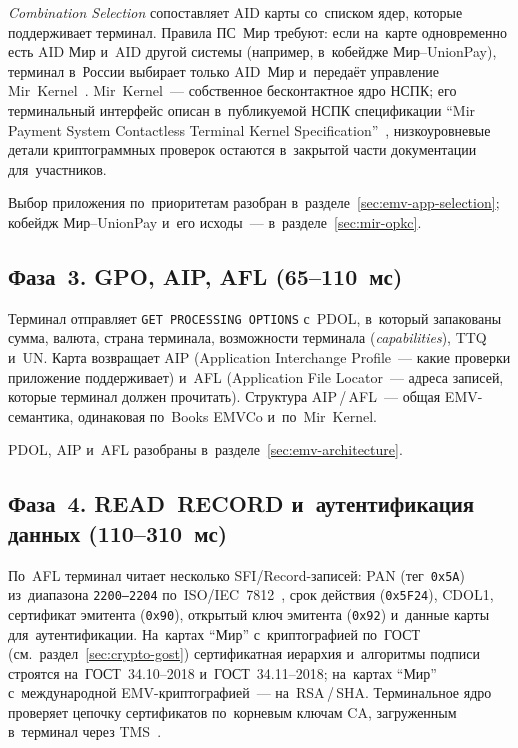\textit{Combination Selection} сопоставляет AID карты со~списком ядер, которые поддерживает
терминал. Правила ПС~Мир требуют: если на~карте
одновременно есть AID Мир и~AID другой системы (например, в~кобейдже
Мир--UnionPay), терминал в~России выбирает только AID~Мир и~передаёт
управление Mir~Kernel~\cite{nspk-mir-rules-v43,nexo-mir-fast-2022}.
Mir~Kernel~--- собственное бесконтактное ядро НСПК; его терминальный интерфейс
описан в~публикуемой НСПК спецификации \enquote{Mir Payment System Contactless
Terminal Kernel Specification}~\cite{nspk-mir-kernel}, низкоуровневые детали
криптограммных проверок остаются в~закрытой части документации для~участников.

Выбор приложения по~приоритетам разобран в~разделе~\ref{sec:emv-app-selection};
кобейдж Мир--UnionPay и~его исходы~--- в~разделе~\ref{sec:mir-opkc}.

\subsection*{Фаза~3. GPO, AIP, AFL (65--110~мс)}

Терминал отправляет \texttt{GET~PROCESSING~OPTIONS} с~PDOL, в~который запакованы
сумма, валюта, страна терминала, возможности терминала (\textit{capabilities}), TTQ и~UN. Карта возвращает AIP
(Application Interchange Profile~--- какие проверки приложение поддерживает)
и~AFL (Application File Locator~--- адреса записей, которые терминал должен
прочитать). Структура AIP\,/\,AFL~--- общая EMV-семантика, одинаковая по~Books
EMVCo и~по~Mir~Kernel.

PDOL, AIP и~AFL разобраны в~разделе~\ref{sec:emv-architecture}.

\subsection*{Фаза~4. READ~RECORD и~аутентификация данных (110--310~мс)}

По~AFL терминал читает несколько SFI/Record-записей: PAN (тег~\texttt{0x5A}) из~диапазона
\texttt{2200--2204} по~ISO/IEC~7812~\cite{iso-7812-transition}, срок действия (\texttt{0x5F24}),
CDOL1, сертификат эмитента (\texttt{0x90}), открытый ключ эмитента (\texttt{0x92}) и~данные карты
для~аутентификации. На~картах \enquote{Мир} с~криптографией по~ГОСТ
(см.~раздел~\ref{sec:crypto-gost}) сертификатная иерархия и~алгоритмы подписи
строятся на~ГОСТ~34.10--2018 и~ГОСТ~34.11--2018; на~картах \enquote{Мир}
с~международной EMV-криптографией~--- на~RSA\,/\,SHA. Терминальное ядро
проверяет цепочку сертификатов по~корневым ключам CA, загруженным в~терминал
через TMS~\cite{nspk-mir-kernel}.

